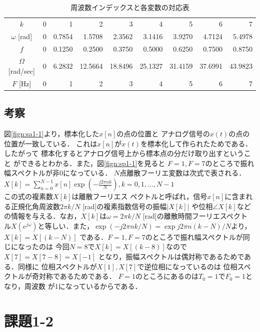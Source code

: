 \documentclass[11pt, a4paper, titlepage]{ltjsarticle}
\begin{document}
\begin{table}[h]
    \centering
    \caption{周波数インデックスと各変数の対応表}
    \begin{tabular}{crrrrrrrr}
  \hline
  $k$&0&1&2&3&4&5&6&7\\
  $\omega$ [rad]&0&	0.7854	&1.5708	&2.3562	&3.1416	&3.9270	&4.7124	&5.4978\\
  $f$&0&0.1250&0.2500&	0.3750&	0.5000&	0.6250&	0.7500&	0.8750\\
  $\Omega$ [rad/sec]&0&	6.2832&12.5664&18.8496&25.1327&31.4159&37.6991&43.9823\\
  $F$ [Hz]&0&	1&	2&	3&	4&	5	&6&	7\\
  \hline

    \end{tabular}
    \label{t1}
\end{table}
\subsection*{考察}
図\ref*{fign:sa1-1}より，標本化した$x[n]$の点の位置と
アナログ信号の$x(t)$の点の位置が一致している．
これは$x[n]$が$x(t)$を標本化して作られたためである．したがって
標本化するとアナログ信号上から標本点の分だけ取り出すということ
ができるとわかる．また，図\ref*{fign:sp1-1}を見ると
$F=1,F=7$のところで振れ幅スペクトルが非0になっている．
$N$点離散フーリエ変数は次式で表される．\\
$\displaystyle X[k] = \sum_{n=0}^{N-1}x[n]\exp
\left(-\frac{j2\pi nk}{N}\right),k=0,1,\dots,N-1$\\
この式の複素数$X[k]$は離散フーリエス
ペクトルと呼ばれ，信号$x[n]$に含まれる正規化角周波数$2\pi k/N$ [rad]の複素指数信号の振幅$|X[k]|$
や位相$\angle X[k]$などの情報を与える．なお，$X[k]$は$\omega=2\pi k/N$ [rad]の離散時間フーリエスペクト
ル$X(e^{j\omega})$と等しい．また，$\exp(-j2\pi nk/N)=\exp{j2\pi n(k-N)/N}$より，$X[k]=X[(k-N)]$
である．$F=1,F=7$のところで振れ幅スペクトルが同じになったのは
今回$N=8$で$X[k]=X[(k-8)]$なので$X[7]=X[7-8]=X[-1]$
となり，振幅スペクトルは偶対称であるためである．同様に
位相スペクトルが$X[1],X[7]$で逆位相になっているのは
位相スペクトルが奇対称であるためである．
$F=1$のところにあるのは$T_{0}=1$で$F_{0}=1$となり，周波数
が1になっているからである．

\newpage
\section*{課題1-2}
\end{document}
